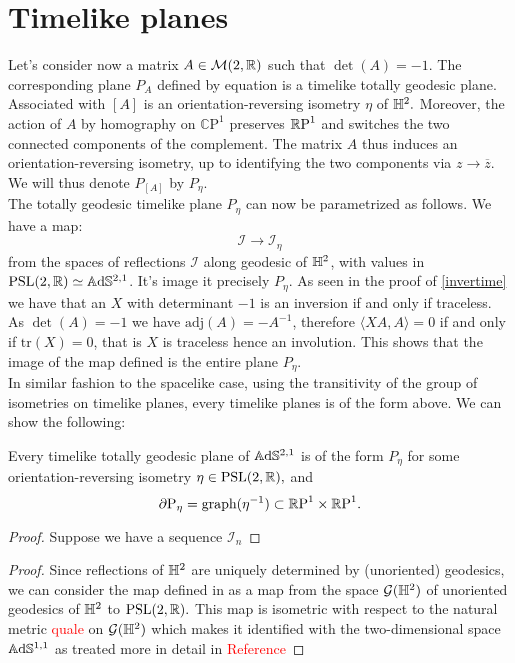 \section{Timelike planes}
Let's consider now a matrix $A\in\mathcal{M}(2,\R)$ such that $\det(A)=-1.$ The corresponding plane $P_A$ defined by equation  is a timelike totally geodesic plane. Associated with $[A]$ is an orientation-reversing isometry $\eta$ of $\H^2.$ Moreover, the action of $A$ by homography on $\mathbb{C}\text{P}^1$ preserves $\S$ and switches the two connected components of the complement. The matrix $A$ thus induces an orientation-reversing isometry, up to identifying the two components via $z\to\overline{z}$. We will thus denote $P_{[A]}$ by $P_\eta$. \\
The totally geodesic timelike plane $P_\eta$ can now be parametrized as follows. We have a map: 
\begin{equation}\label{refspa}
    \mathcal{I}\to\mathcal{I}_\eta
\end{equation}
from the spaces of reflections $\mathcal{I}$ along geodesic of $\H^2$, with values in $\PSL\simeq\A^{2,1}$. It's image it precisely $P_\eta.$ As seen in the proof of \ref{invertime} we have that an $X$ with determinant $-1$ is an inversion if and only if traceless. As $\det(A)=-1$ we have $\text{adj}(A)=-A^{-1}$, therefore $\langle XA,A\rangle=0$ if and only if $\text{tr}(X)=0$, that is $X$ is traceless hence an involution. This shows that the image of the map defined  is the entire plane $P_\eta$.\\  
In similar fashion to the spacelike case, using the transitivity of the group of isometries on timelike planes, every timelike planes is of the form above. We can show the following: 
\begin{lemma}
    Every timelike totally geodesic plane of $\A^{2,1}$ is of the form $P_\eta$ for some orientation-reversing isometry $\eta\in\PSL,$ and 
    \[
        \partial\text{P}_\eta=\text{graph}(\eta^{-1})\subset\T.
    \]
\end{lemma}
\begin{proof}
    Suppose we have a sequence $\mathcal{I}_n$
\end{proof}
\begin{proof}
    Since reflections of $\H^2$ are uniquely determined by (unoriented) geodesics, we can consider the map defined in  as a map from the space $\mathcal{G}(\H^2)$ of unoriented geodesics of $\H^2$ to $\PSL.$ This map is isometric with respect to the natural metric \textcolor{red}{quale} on $\mathcal{G}(\H^2)$ which makes it identified with the two-dimensional space $\A^{1,1}$ as treated more in detail in \textcolor{red}{Reference}
    \end{proof}

